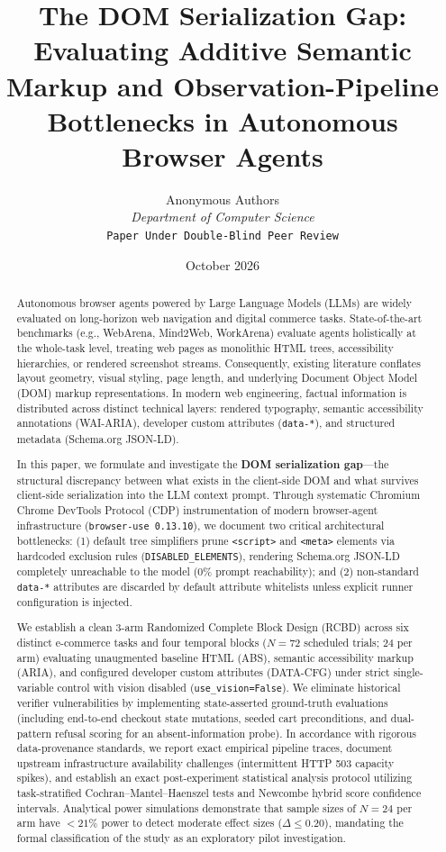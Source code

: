 \documentclass[11pt,a4paper]{article}
\title{\textbf{The DOM Serialization Gap: Evaluating Additive Semantic Markup and Observation-Pipeline Bottlenecks in Autonomous Browser Agents}}
\author{
  Anonymous Authors \\
  \textit{Department of Computer Science} \\
  \texttt{Paper Under Double-Blind Peer Review}
}
\date{October 2026}
\begin{document}
\maketitle

\begin{abstract}
Autonomous browser agents powered by Large Language Models (LLMs) are widely evaluated on long-horizon web navigation and digital commerce tasks. State-of-the-art benchmarks (e.g., WebArena, Mind2Web, WorkArena) evaluate agents holistically at the whole-task level, treating web pages as monolithic HTML trees, accessibility hierarchies, or rendered screenshot streams. Consequently, existing literature conflates layout geometry, visual styling, page length, and underlying Document Object Model (DOM) markup representations. In modern web engineering, factual information is distributed across distinct technical layers: rendered typography, semantic accessibility annotations (WAI-ARIA), developer custom attributes (\texttt{data-*}), and structured metadata (Schema.org JSON-LD). 

In this paper, we formulate and investigate the \textbf{DOM serialization gap}---the structural discrepancy between what exists in the client-side DOM and what survives client-side serialization into the LLM context prompt. Through systematic Chromium Chrome DevTools Protocol (CDP) instrumentation of modern browser-agent infrastructure (\texttt{browser-use 0.13.10}), we document two critical architectural bottlenecks: (1) default tree simplifiers prune \texttt{<script>} and \texttt{<meta>} elements via hardcoded exclusion rules (\texttt{DISABLED\_ELEMENTS}), rendering Schema.org JSON-LD completely unreachable to the model ($0\%$ prompt reachability); and (2) non-standard \texttt{data-*} attributes are discarded by default attribute whitelists unless explicit runner configuration is injected. 

We establish a clean 3-arm Randomized Complete Block Design (RCBD) across six distinct e-commerce tasks and four temporal blocks ($N=72$ scheduled trials; 24 per arm) evaluating unaugmented baseline HTML (\textsc{ABS}), semantic accessibility markup (\textsc{ARIA}), and configured developer custom attributes (\textsc{DATA-CFG}) under strict single-variable control with vision disabled (\texttt{use\_vision=False}). We eliminate historical verifier vulnerabilities by implementing state-asserted ground-truth evaluations (including end-to-end checkout state mutations, seeded cart preconditions, and dual-pattern refusal scoring for an absent-information probe). In accordance with rigorous data-provenance standards, we report exact empirical pipeline traces, document upstream infrastructure availability challenges (intermittent HTTP 503 capacity spikes), and establish an exact post-experiment statistical analysis protocol utilizing task-stratified Cochran--Mantel--Haenszel tests and Newcombe hybrid score confidence intervals. Analytical power simulations demonstrate that sample sizes of $N=24$ per arm have $<21\%$ power to detect moderate effect sizes ($\Delta \le 0.20$), mandating the formal classification of the study as an exploratory pilot investigation.
\end{abstract}
\end{document}

